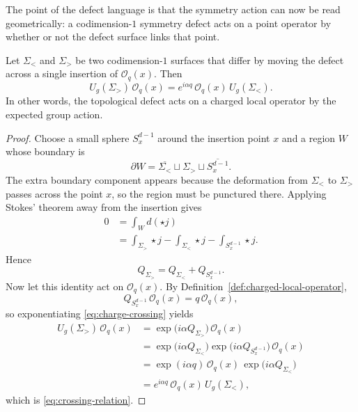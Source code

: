 \noindent The point of the defect language is that the symmetry action can now be read geometrically: a codimension-$1$ symmetry defect acts on a point operator by whether or not the defect surface links that point.

\begin{proposition}\label{prop:zero-form-crossing}
Let $\Sigma_{<}$ and $\Sigma_{>}$ be two codimension-$1$ surfaces that differ by moving the defect across a single insertion of $\mathcal O_q(x)$. Then
\begin{equation}\label{eq:crossing-relation}
U_g(\Sigma_{>})\,\mathcal O_q(x)
=
e^{i\alpha q}\,\mathcal O_q(x)\,U_g(\Sigma_{<}).
\end{equation}
In other words, the topological defect acts on a charged local operator by the expected group action.
\end{proposition}

\begin{proof}
Choose a small sphere $S_x^{d-1}$ around the insertion point $x$ and a region $W$ whose boundary is
\begin{equation*}
\partial W = \overline{\Sigma_{<}}\sqcup \Sigma_{>}\sqcup \overline{S_x^{d-1}}.
\end{equation*}
The extra boundary component appears because the deformation from $\Sigma_{<}$ to $\Sigma_{>}$ passes across the point $x$, so the region must be punctured there. Applying Stokes' theorem away from the insertion gives
\begin{align*}
0
&=
\int_W d(\star j) \\
&=
\int_{\Sigma_{>}}\star j
-\int_{\Sigma_{<}}\star j
-\int_{S_x^{d-1}}\star j.
\end{align*}
Hence
\begin{equation}\label{eq:charge-crossing}
Q_{\Sigma_{>}} = Q_{\Sigma_{<}} + Q_{S_x^{d-1}}.
\end{equation}
Now let this identity act on $\mathcal O_q(x)$. By Definition~\ref{def:charged-local-operator},
\begin{equation*}
Q_{S_x^{d-1}}\,\mathcal O_q(x)=q\,\mathcal O_q(x),
\end{equation*}
so exponentiating \eqref{eq:charge-crossing} yields
\begin{align*}
U_g(\Sigma_{>})\,\mathcal O_q(x)
&=
\exp\!\bigl(i\alpha Q_{\Sigma_{>}}\bigr)\,\mathcal O_q(x) \\
&=
\exp\!\bigl(i\alpha Q_{\Sigma_{<}}\bigr)\exp\!\bigl(i\alpha Q_{S_x^{d-1}}\bigr)\,\mathcal O_q(x) \\
&=
\exp(i\alpha q)\,\mathcal O_q(x)\,\exp\!\bigl(i\alpha Q_{\Sigma_{<}}\bigr) \\
&=
e^{i\alpha q}\,\mathcal O_q(x)\,U_g(\Sigma_{<}),
\end{align*}
which is \eqref{eq:crossing-relation}.
\end{proof}

